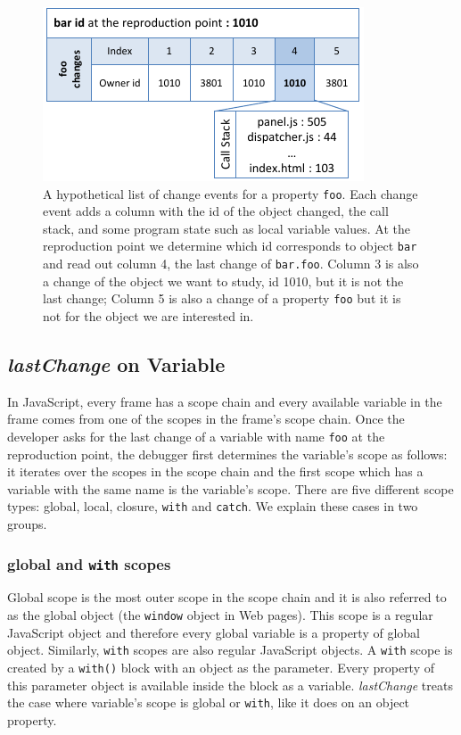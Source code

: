 \documentclass{sig-alternate}
\begin{document}
\begin{figure}[htp]
\centering 
\includegraphics [width=.48\textwidth] {6-foo-changes1.pdf} %
\caption{A hypothetical list of  change events for a property \texttt{foo}. 
Each change event adds a column with the id of the object changed, the call stack,
and some program state such as local variable values. 
At the reproduction point  we determine which id  corresponds to 
object \texttt{bar} and read out column 4,  the last
  change of \texttt{bar.foo}. Column 3 is also a change of
  the object we want to study, id 1010, but it is not the last change;
  Column 5 is also a change of a property \texttt{foo} but it is not for
  the object we are interested in.}
\label{fig:foo-changes1}
\end{figure}

\subsection{{\large\bf\textit{lastChange}} on Variable} 
In JavaScript, every frame has a scope chain and every available
variable in the frame comes from one of the scopes in the frame's
scope chain. Once the developer asks for the last change of a variable with name 
\texttt{foo} at the reproduction point, the debugger first determines the
variable's scope as follows: it iterates over the scopes in the scope
chain and the first scope which has a variable with the same name is
the variable's scope. There are five different scope types: global, local,
closure, \texttt{with} and \texttt{catch}. We explain these
cases in two groups.

\subsubsection{global and \texttt{with} scopes}
Global scope is the most outer scope in the scope chain and it is
also referred to as the global object (the \texttt{window}
object in Web pages). This scope is a regular JavaScript object and therefore every
global variable is a property of global object. Similarly,
 \texttt{with} scopes are also regular JavaScript objects. A \texttt{with}
scope is created by a \texttt{with()} block with an object as the
parameter. Every property of this parameter object is available inside the
block as a variable. \textit{lastChange} treats the case where variable's scope
is global or \texttt{with}, like it does on an object
property.
\end{document}
